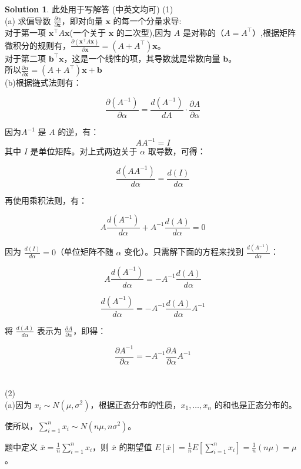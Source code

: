 \documentclass[a4paper,UTF8]{article}
\numberwithin{equation}{section}
\theoremstyle{definition}
\newtheorem*{solution}{Solution}
\begin{document}
\begin{solution}
	此处用于写解答 (中英文均可)
	(1)\\
	(a)  求偏导数 $\frac{\partial \alpha}{\partial \mathbf{x}}$，即对向量 $\mathbf{x}$ 的每一个分量求导:\\
 对于第一项 $\mathbf{x}^{\top}A\mathbf{x}$(一个关于 $\mathbf{x}$ 的二次型),因为 $A$ 是对称的（$A = A^{\top}$）,根据矩阵微积分的规则有，$\frac{\partial (\mathbf{x}^{\top}A\mathbf{x})}{\partial \mathbf{x}} = (A + A^{\top})\mathbf{x}$。\\
对于第二项 $\mathbf{b}^{\top}\mathbf{x}$，这是一个线性的项，其导数就是常数向量 $\mathbf{b}$。\\
 所以$\frac{\partial \alpha}{\partial \mathbf{x}} = (A + A^{\top})\mathbf{x} + \mathbf{b}$ \\
	(b)根据链式法则有：

$$\frac{\partial (A^{-1})}{\partial \alpha} = \frac{d(A^{-1})}{dA} \cdot \frac{\partial A}{\partial \alpha}$$

 因为$A^{-1}$ 是 $A$ 的逆，有：
$$AA^{-1} = I$$
其中 $I$ 是单位矩阵。对上式两边关于 $\alpha$ 取导数，可得：

$$\frac{d(AA^{-1})}{d\alpha} = \frac{d(I)}{d\alpha}$$

再使用乘积法则，有：

$$A \frac{d(A^{-1})}{d\alpha} + A^{-1} \frac{d(A)}{d\alpha} = 0$$

因为 $\frac{d(I)}{d\alpha} = 0$（单位矩阵不随 $\alpha$ 变化）。只需解下面的方程来找到 $\frac{d(A^{-1})}{d\alpha}$：

$$A \frac{d(A^{-1})}{d\alpha} = -A^{-1} \frac{d(A)}{d\alpha}$$

$$\frac{d(A^{-1})}{d\alpha} = -A^{-1} \frac{d(A)}{d\alpha} A^{-1}$$

将 $\frac{d(A)}{d\alpha}$ 表示为 $\frac{\partial A}{\partial \alpha}$，即得：

$$\frac{\partial A^{-1}}{\partial \alpha} = -A^{-1} \frac{\partial A}{\partial \alpha} A^{-1}$$\\
    ~\\
    (2)\\
    (a)因为 $x_i \sim N(\mu, \sigma^2)$，根据正态分布的性质，$x_1, \ldots, x_n$ 的和也是正态分布的。

使所以，$\sum_{i=1}^{n} x_i \sim N(n\mu, n\sigma^2)$。

题中定义 $\bar{x} = \frac{1}{n}\sum_{i=1}^{n} x_i$，则 $\bar{x}$ 的期望值 $E[\bar{x}] = \frac{1}{n} E[\sum_{i=1}^{n} x_i] = \frac{1}{n}(n\mu) = \mu$。


\end{solution}
\end{document}
